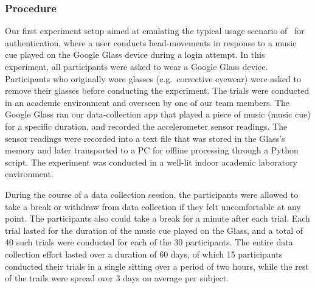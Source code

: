 \subsubsection{Procedure}
Our first experiment setup aimed at emulating the typical usage scenario
of \systemname~for authentication, where a user conducts head-movements in
response to a music cue played on the Google Glass device during a login
attempt.
In this experiment, all participants were asked to wear a Google Glass
device. Participants who originally wore glasses (e.g.~corrective eyewear) were asked to remove their
glasses before conducting the experiment.
The trials were conducted in an academic environment and overseen by one of
our team members.
The Google Glass ran our data-collection app that played a piece of
music (music cue) for a specific duration, and recorded the accelerometer
sensor readings. %
The sensor readings were recorded into a text file that was stored
in the Glass's memory and later transported to a PC for offline processing
through a Python script. The experiment was conducted in a well-lit indoor
academic laboratory environment.

During the course of a data collection session, the participants were allowed to take a
break or withdraw from data collection if they felt uncomfortable at any
point. %
The participants also could take a break for a minute after each trial.
Each trial lasted for the duration of the music cue played on the Glass, and
a total of 40 such trials were conducted for each of the 30 participants.
The entire data collection effort lasted over a duration of 60 days, of which 15
participants conducted their trials in a single sitting over a period of two
hours, while the rest of the trails were spread over 3 days on average per
subject.

